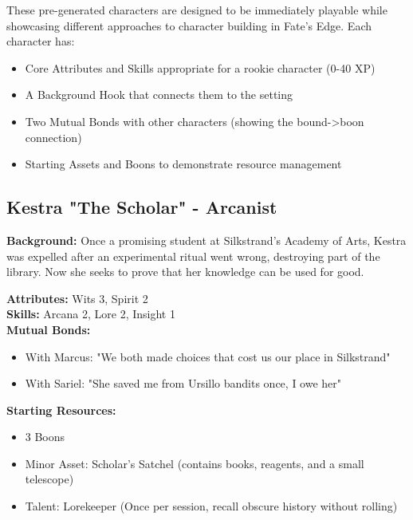 \documentclass[11pt]{article}
\newenvironment{characterbox}[1]{%
  \begin{mdframed}[backgroundcolor=shadecolor, linewidth=1pt, linecolor=headercolor]%
  \subsection*{#1}%
}{%
  \end{mdframed}%
}
\begin{document}
These pre-generated characters are designed to be immediately playable while showcasing different approaches to character building in Fate's Edge. Each character has:
\begin{itemize}
\item Core Attributes and Skills appropriate for a rookie character (0-40 XP)
\item A Background Hook that connects them to the setting
\item Two Mutual Bonds with other characters (showing the bound->boon connection)
\item Starting Assets and Boons to demonstrate resource management
\end{itemize}

\begin{characterbox}{Kestra "The Scholar" - Arcanist}
\textbf{Background:} Once a promising student at Silkstrand's Academy of Arts, Kestra was expelled after an experimental ritual went wrong, destroying part of the library. Now she seeks to prove that her knowledge can be used for good.

\textbf{Attributes:} Wits 3, Spirit 2 \\
\textbf{Skills:} Arcana 2, Lore 2, Insight 1 \\
\textbf{Mutual Bonds:} 
\begin{itemize}
\item With Marcus: "We both made choices that cost us our place in Silkstrand"
\item With Sariel: "She saved me from Ursillo bandits once, I owe her"
\end{itemize}

\textbf{Starting Resources:}
\begin{itemize}
\item 3 Boons
\item Minor Asset: Scholar's Satchel (contains books, reagents, and a small telescope)
\item Talent: Lorekeeper (Once per session, recall obscure history without rolling)
\end{itemize}
\end{characterbox}
\end{document}
